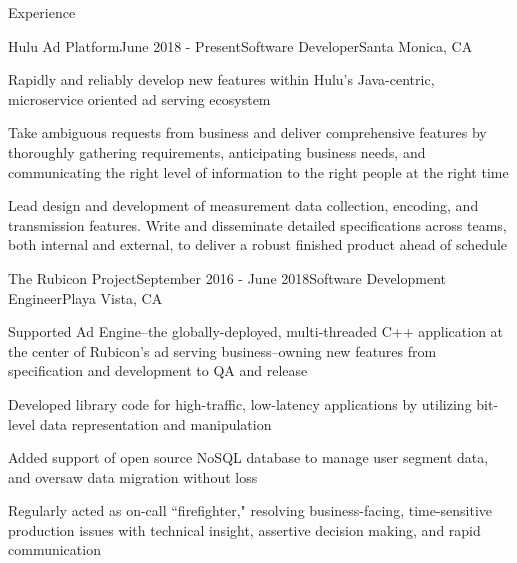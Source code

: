 \documentclass{resume} %
\begin{document}
\begin{rSection}{Experience}

\begin{rSubsection}{Hulu Ad Platform}{June 2018 - Present}{Software Developer}{Santa Monica, CA}
\item Rapidly and reliably develop new features within Hulu's Java-centric, microservice oriented ad serving ecosystem
\item Take ambiguous requests from business and deliver comprehensive features by thoroughly gathering requirements, anticipating business needs, and communicating the right level of information to the right people at the right time
\item Lead design and development of measurement data collection, encoding, and transmission features. Write and disseminate detailed specifications across teams, both internal and external, to deliver a robust finished product ahead of schedule
\end{rSubsection}

\begin{rSubsection}{The Rubicon Project}{September 2016 - June 2018}{Software Development Engineer}{Playa Vista, CA}
\item Supported Ad Engine--the globally-deployed, multi-threaded C++ application at the center of Rubicon's ad serving business--owning new features from specification and development to QA and release
\item Developed library code for high-traffic, low-latency applications by utilizing bit-level data representation and manipulation
\item Added support of open source NoSQL database to manage user segment data, and oversaw data migration without loss
\item Regularly acted as on-call ``firefighter," resolving business-facing, time-sensitive production issues with technical insight, assertive decision making, and rapid communication
\end{rSubsection}


\end{rSection}
\end{document}

